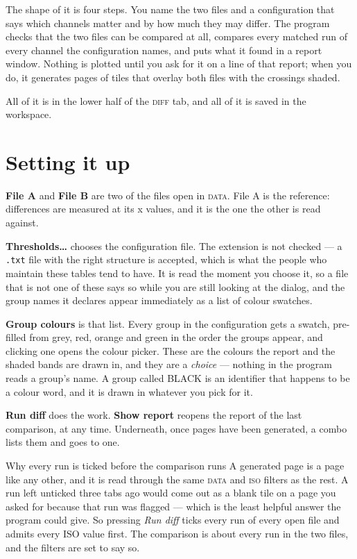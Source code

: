\documentclass[11pt,a4paper,oneside]{report}
\newcommand{\code}[1]{\texttt{#1}}
\newcommand{\tab}[1]{\textsc{#1}}
\begin{document}
The shape of it is four steps. You name the two files and a configuration that
says which channels matter and by how much they may differ. The program checks
that the two files can be compared at all, compares every matched run of every
channel the configuration names, and puts what it found in a report window.
Nothing is plotted until you ask for it on a line of that report; when you do,
it generates pages of tiles that overlay both files with the crossings shaded.

All of it is in the lower half of the \tab{diff} tab, and all of it is saved in
the workspace.

\section{Setting it up}

\textbf{File A} and \textbf{File B} are two of the files open in \tab{data}.
File A is the reference: differences are measured at its x values, and it is
the one the other is read against.

\textbf{Thresholds\ldots} chooses the configuration file. The extension is not
checked --- a \code{.txt} file with the right structure is accepted, which is
what the people who maintain these tables tend to have. It is read the moment
you choose it, so a file that is not one of these says so while you are still
looking at the dialog, and the group names it declares appear immediately as a
list of colour swatches.

\textbf{Group colours} is that list. Every group in the configuration gets a
swatch, pre-filled from grey, red, orange and green in the order the groups
appear, and clicking one opens the colour picker. These are the colours the
report and the shaded bands are drawn in, and they are a \emph{choice} ---
nothing in the program reads a group's name. A group called BLACK is an
identifier that happens to be a colour word, and it is drawn in whatever you
pick for it.

\textbf{Run diff} does the work. \textbf{Show report} reopens the report of
the last comparison, at any time. Underneath, once pages have been generated,
a combo lists them and goes to one.

\begin{aoenote}{Why every run is ticked before the comparison runs}
A generated page is a page like any other, and it is read through the same
\tab{data} and \tab{iso} filters as the rest. A run left unticked three tabs
ago would come out as a blank tile on a page you asked for because that run was
flagged --- which is the least helpful answer the program could give. So
pressing \emph{Run diff} ticks every run of every open file and admits every
ISO value first. The comparison is about every run in the two files, and the
filters are set to say so.
\end{aoenote}
\end{document}
